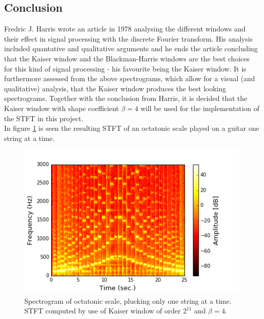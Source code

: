 \subsection{Conclusion}
Fredric J. Harris wrote an article \cite{fredric_harris} in 1978 analysing the different windows and their effect in signal processing with the discrete Fourier transform. His analysis included quantative and qualitative arguments and he ends the article concluding that the Kaiser window and the Blackman-Harris windows are the best choices for this kind of signal processing - his favourite being the Kaiser window. It is furthermore assessed from the above spectrograms, which allow for a visual (and qualitative) analysis, that the Kaiser window produces the best looking spectrograms. Together with the conclusion from Harris, it is decided that the Kaiser window with shape coefficient $\beta = 4$ will be used for the implementation of the STFT in this project. \\
In figure \ref{fig:STFT_test_signal} is seen the resulting STFT of an octatonic scale played on a guitar one string at a time.  
\begin{figure}[H]
\centering
\includegraphics[scale = 0.6]{figures/validation/stft/scale.png}
\caption{Spectrogram of octatonic scale, plucking only one string at a time. STFT computed by use of Kaiser window of order $2^{11}$ and $\beta = 4$.}
\label{fig:STFT_test_signal}
\end{figure}
















